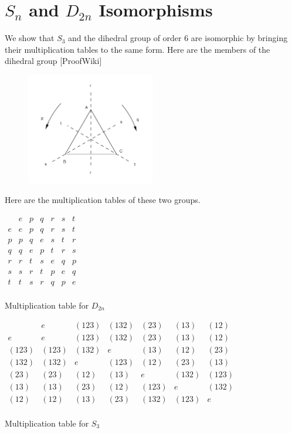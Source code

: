 \documentclass[12pt]{article}
\begin{document}
\pagebreak
\section{$S_n$ and $D_{2n}$ Isomorphisms}
We show that $S_3$ and the dihedral group of order 6 are isomorphic by bringing their multiplication tables to the same form. Here are the members of the dihedral group [ProofWiki]

\begin{figure}[!htb]
\centering
\includegraphics[width=0.5\textwidth]{SymmetryGroupEqTriangle.png}
\end{figure}

Here are the multiplication tables of these two groups.\\

\begin{table}[!htb]
    \begin{subtable}{.4\textwidth}
      \centering
$\begin{array}{c|cccccc}
  & e & p & q & r & s & t \\
\hline
e & e & p & q & r & s & t \\
p & p & q & e & s & t & r \\
q & q & e & p & t & r & s \\
r & r & t & s & e & q & p \\
s & s & r & t & p & e & q \\
t & t & s & r & q & p & e \\
\end{array}$
\caption{Multiplication table for $D_{2n}$}
    \end{subtable}
    \begin{subtable}{.6\textwidth}
      \centering
$\begin{array}{c|cccccc}
  & e & (123) & (132) & (23) & (13) & (12) \\
\hline
e & e & (123) & (132) & (23) & (13) & (12) \\
(123) & (123) & (132) & e & (13) & (12) & (23) \\
(132) & (132) & e & (123) & (12) & (23) & (13) \\
(23) & (23) & (12) & (13) & e & (132) & (123) \\
(13) & (13) & (23) & (12) & (123) & e & (132) \\
(12) & (12) & (13) & (23) & (132) & (123) & e \\
\end{array}$
\caption{Multiplication table for $S_3$}
    \end{subtable} 
\end{table}
\end{document}

